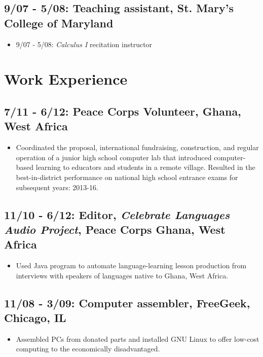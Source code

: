 \documentclass[11pt]{cv}
\begin{document}
\subsection*{9/07 - 5/08: Teaching assistant, St. Mary's College of Maryland}
\label{sec:org2a8d679}
\begin{itemize}
\item 9/07 - 5/08: \emph{Calculus I} recitation instructor\\
\end{itemize}
\section*{Work Experience}
\label{sec:org35ecd32}
\subsection*{7/11 - 6/12: Peace Corps Volunteer, Ghana, West Africa}
\label{sec:orga24de46}
\begin{itemize}
\item Coordinated the proposal, international fundraising, construction, and regular operation of a junior high school computer lab that introduced computer-based learning to educators and students in a remote village. Resulted in the best-in-district performance on national high school entrance exams for subsequent years: 2013-16.\\
\end{itemize}
\subsection*{11/10 - 6/12: Editor, \emph{Celebrate Languages Audio Project}, Peace Corps Ghana, West Africa}
\label{sec:org86b69a4}
\begin{itemize}
\item Used Java program to automate language-learning lesson production from interviews with speakers of languages native to Ghana, West Africa.\\
\end{itemize}
\subsection*{11/08 - 3/09: Computer assembler, FreeGeek, Chicago, IL}
\label{sec:org5fb559a}
\begin{itemize}
\item Assembled PCs from donated parts and installed GNU Linux to offer low-cost computing to the economically disadvantaged.\\
\end{itemize}
\end{document}
